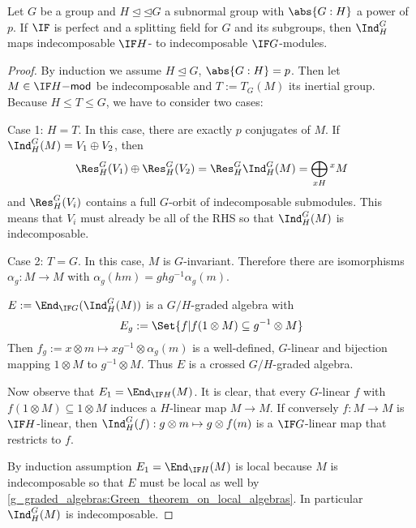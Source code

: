 
\begin{theorem}
Let $G$ be a group and $H\unlhd\unlhd G$ a subnormal group with $\abs{G:H}$ a power of $p$. If $\IF$ is perfect and a splitting field for $G$ and its subgroups, then $\Ind_H^G$ maps indecomposable $\IF H$- to indecomposable $\IF G$-modules.
\end{theorem}
\begin{proof}
By induction we assume $H\unlhd G$, $\abs{G:H}=p$. Then let $M\in \IF H\mathsf{-mod}$ be indecomposable and $T:=T_G(M)$ its inertial group. Because $H\leq T\leq G$, we have to consider two cases:

\medbreak
Case 1: $H=T$. In this case, there are exactly $p$ conjugates of $M$. If $\Ind_H^G(M) = V_1\oplus V_2$, then
\[\Res_H^G(V_1)\oplus\Res_H^G(V_2) = \Res_H^G\Ind_H^G(M) = \bigoplus_{xH} {^x M}\]
and $\Res_H^G(V_i)$ contains a full $G$-orbit of indecomposable submodules. This means that $V_i$ must already be all of the RHS so that $\Ind_H^G(M)$ is indecomposable.

\medbreak
Case 2: $T=G$. In this case, $M$ is $G$-invariant. Therefore there are isomorphisms $\alpha_g: M\to M$ with $\alpha_g(hm) = ghg^{-1} \alpha_g(m)$.

$E:=\End_{\IF G}(\Ind_H^G(M))$ is a $G/H$-graded algebra with
\[E_g:=\Set{f | f(1\otimes M)\subseteq g^{-1}\otimes M}\]
Then $f_g := x\otimes m\mapsto xg^{-1}\otimes\alpha_g(m)$ is a well-defined, $G$-linear and bijection mapping $1\otimes M$ to $g^{-1}\otimes M$. Thus $E$ is a crossed $G/H$-graded algebra.

Now observe that $E_1=\End_{\IF H}(M)$. It is clear, that every $G$-linear $f$ with $f(1\otimes M)\subseteq 1\otimes M$ induces a $H$-linear map $M\to M$. If conversely $f:M\to M$ is $\IF H$-linear, then $\Ind_H^G(f):g\otimes m\mapsto g\otimes f(m)$ is a $\IF G$-linear map that restricts to $f$.

By induction assumption $E_1=\End_{\IF H}(M)$ is local because $M$ is indecomposable so that $E$ must be local as well by \ref{g_graded_algebras:Green_theorem_on_local_algebras}. In particular $\Ind_H^G(M)$ is indecomposable.
\end{proof}

